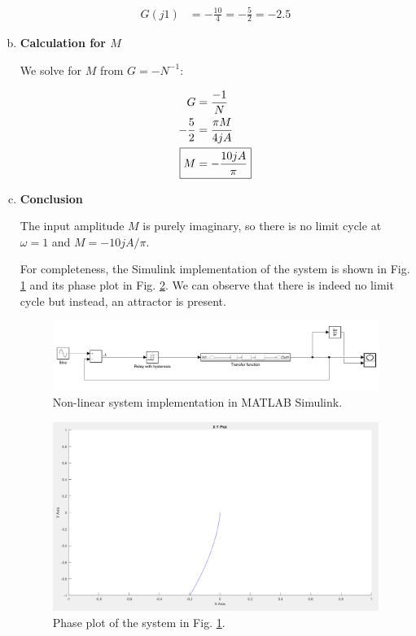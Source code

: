 \documentclass[12pt,a4paper]{article}
\begin{document}
\begin{enumerate}[a)]
\begin{align}
	G(j1) &= -\frac{10}{4} = -\frac{5}{2} = -2.5
\end{align}

\item \textbf{Calculation for $M$}

We solve for $M$ from $G = -N^{-1}$:

\begin{align}
	G &= \frac{-1}{N} \\
	-\frac{5}{2} &= \frac{\pi M}{4jA} \\
	\Aboxed{
		M &= -\frac{10jA}{\pi}
	} \label{eq:M}
\end{align}

\item \textbf{Conclusion}

The input amplitude $M$ is purely imaginary, so there is no limit cycle at $\omega = 1$ and $M = -10jA/\pi$.

For completeness, the Simulink implementation of the system is shown in Fig. \ref{fig:df-simulink} and its phase plot in Fig. \ref{fig:df-phase}. We can observe that there is indeed no limit cycle but instead, an attractor is present.

\begin{figure}[h!]
	\centering
	\includegraphics[width=\linewidth]{df_simulink.png}
	\caption{Non-linear system implementation in MATLAB Simulink.}
	\label{fig:df-simulink}
\end{figure}

\begin{figure}[h!]
	\centering
	\includegraphics[width=0.9\linewidth]{LE3_df_phase.png}
	\caption{Phase plot of the system in Fig. \ref{fig:df-simulink}.}
	\label{fig:df-phase}
\end{figure}

\end{enumerate}
\end{document}
